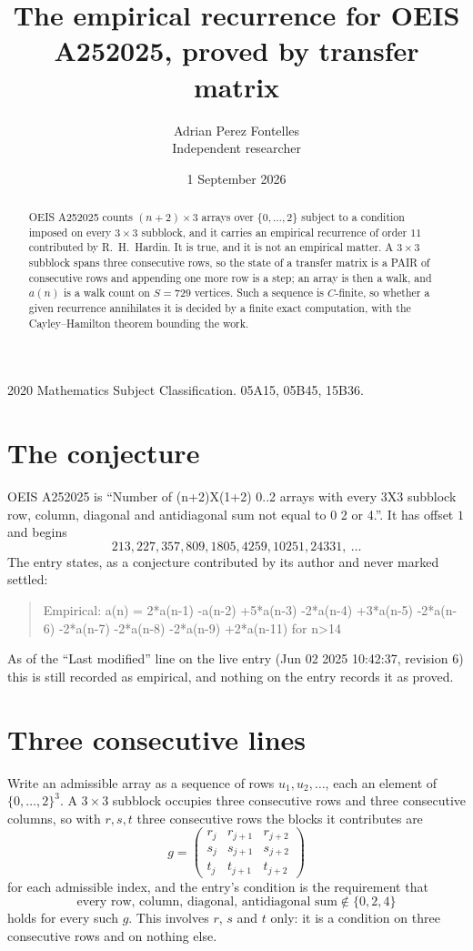\documentclass[11pt,a4paper]{article}
\title{The empirical recurrence for OEIS A252025, proved by transfer matrix}
\author{Adrian Perez Fontelles\\ \small Independent researcher}
\date{1 September 2026}
\theoremstyle{plain}
\theoremstyle{definition}
\begin{document}
\maketitle

\begin{abstract}
OEIS A252025 counts $(n+2)\times3$ arrays over $\{0,\dots,2\}$ subject to a condition imposed on
every $3\times3$ subblock, and it carries an empirical recurrence of order $11$
contributed by R.~H.~Hardin. It is true, and it is not an empirical matter. A $3\times3$
subblock spans three consecutive rows, so the state of a transfer matrix is a PAIR of
consecutive rows and appending one more row is a step; an array is then a walk, and
$a(n)$ is a walk count on $S=729$ vertices. Such a sequence is $C$-finite, so whether a given
recurrence annihilates it is decided by a finite exact computation, with the Cayley--Hamilton
theorem bounding the work.
\end{abstract}

\noindent\small 2020 Mathematics Subject Classification. 05A15, 05B45, 15B36.\normalsize

\section{The conjecture}

OEIS A252025 is ``Number of (n+2)X(1+2) 0..2 arrays with every 3X3 subblock row, column, diagonal and antidiagonal sum not equal to 0 2 or 4.''. It has offset $1$ and begins
\[
213, 227, 357, 809, 1805, 4259, 10251, 24331,\ \dots
\]
The entry states, as a conjecture contributed by its author and never marked settled:
\begin{quote}
Empirical: a(n) = 2*a(n-1) -a(n-2) +5*a(n-3) -2*a(n-4) +3*a(n-5) -2*a(n-6) -2*a(n-7) -2*a(n-8) -2*a(n-9) +2*a(n-11) for n>14
\end{quote}
As of the ``Last modified'' line on the live entry (Jun 02 2025 10:42:37, revision 6) this is still
recorded as empirical, and nothing on the entry records it as proved.

\section{Three consecutive lines}

Write an admissible array as a sequence of rows $u_1,u_2,\dots$, each an element of
$\{0,\dots,2\}^{3}$. A $3\times3$ subblock occupies three consecutive rows and
three consecutive columns, so with $r,s,t$ three consecutive rows the blocks it
contributes are
\[
g=\begin{pmatrix}r_j&r_{j+1}&r_{j+2}\\ s_j&s_{j+1}&s_{j+2}\\ t_j&t_{j+1}&t_{j+2}\end{pmatrix}
\]
for each admissible index, and the entry's condition is the requirement that
\[
\text{every row, column, diagonal, antidiagonal sum} \notin \{0,2,4\}
\]
holds for every such $g$. This involves $r$, $s$ and $t$ only: it is a condition on
three consecutive rows and on nothing else.
\end{document}
